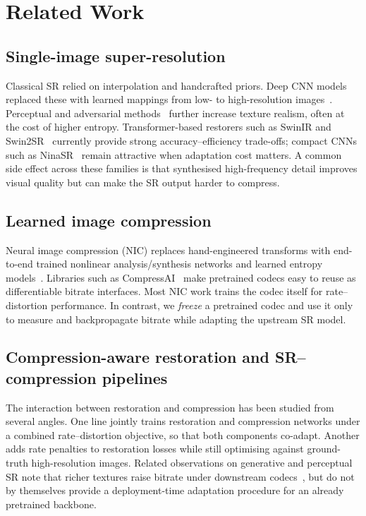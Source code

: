 \section{Related Work}
\label{sec:related}

\subsection{Single-image super-resolution}

Classical SR relied on interpolation and handcrafted priors. Deep CNN models
replaced these with learned mappings from low- to high-resolution
images~\cite{dong2014srcnn,lim2017edsr,zhang2018rcan}. Perceptual and
adversarial methods~\cite{ledig2017srgan,wang2021realesrgan} further increase
texture realism, often at the cost of higher entropy. Transformer-based
restorers such as SwinIR and Swin2SR~\cite{liang2021swinir,conde2022swin2sr}
currently provide strong accuracy--efficiency trade-offs; compact CNNs such as
NinaSR~\cite{gouvine2021torchsr} remain attractive when adaptation cost matters.
A common side effect across these families is that synthesised high-frequency
detail improves visual quality but can make the SR output harder to compress.

\subsection{Learned image compression}

Neural image compression (NIC) replaces hand-engineered transforms with
end-to-end trained nonlinear analysis/synthesis networks and learned entropy
models~\cite{balle2016end,balle2018variational,cheng2020learned}. Libraries
such as CompressAI~\cite{begaint2020compressai} make pretrained codecs easy to
reuse as differentiable bitrate interfaces. Most NIC work trains the codec
itself for rate--distortion performance. In contrast, we \emph{freeze} a
pretrained codec and use it only to measure and backpropagate bitrate while
adapting the upstream SR model.

\subsection{Compression-aware restoration and SR--compression pipelines}

The interaction between restoration and compression has been studied from
several angles. One line jointly trains restoration and compression networks
under a combined rate--distortion objective, so that both components co-adapt.
Another adds rate penalties to restoration losses while still optimising against
ground-truth high-resolution images. Related observations on generative and
perceptual SR note that richer textures raise bitrate under downstream
codecs~\cite{ledig2017srgan,blau2018perception}, but do not by themselves
provide a deployment-time adaptation procedure for an already pretrained
backbone.

